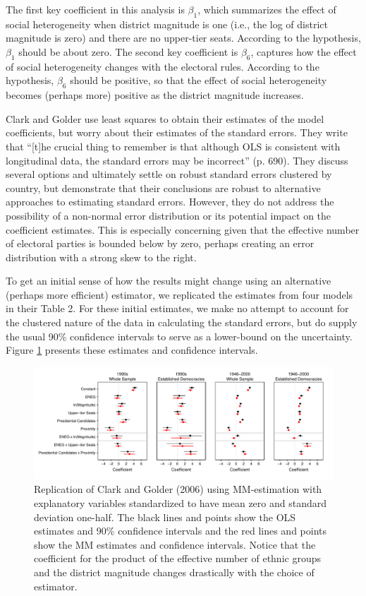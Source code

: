 \documentclass[10pt]{article}
\begin{document}
The first key coefficient in this analysis is $\beta_1$, which summarizes the effect of social heterogeneity when district magnitude is one (i.e., the log of district magnitude is zero) and there are no upper-tier seats. According to the hypothesis, $\beta_1$ should be about zero. The second key coefficient is $\beta_6$, captures how the effect of social heterogeneity changes with the electoral rules. According to the hypothesis, $\beta_6$ should be positive, so that the effect of social heterogeneity becomes (perhaps more) positive as the district magnitude increases.

Clark and Golder use least squares to obtain their estimates of the model coefficients, but worry about their estimates of the standard errors. They write that ``[t]he crucial thing to remember is that although OLS is consistent with longitudinal data, the standard errors may be incorrect'' (p. 690). They discuss several options and ultimately settle on robust standard errors clustered by country, but demonstrate that their conclusions are robust to alternative approaches to estimating standard errors. However, they do not address the possibility of a non-normal error distribution or its potential impact on the coefficient estimates. This is especially concerning given that the effective number of electoral parties is bounded below by zero, perhaps creating an error distribution with a strong skew to the right. 

To get an initial sense of how the results might change using an alternative (perhaps more efficient) estimator, we replicated the estimates from four models in their Table 2. For these initial estimates, we make no attempt to account for the clustered nature of the data in calculating the standard errors, but do supply the usual 90\% confidence intervals to serve as a lower-bound on the uncertainty. Figure \ref{fig:cg-coef-plots} presents these estimates and confidence intervals.

\begin{figure}[H]
\begin{center}
\includegraphics[scale = .8]{figs/cg-coef-plots.pdf}
\caption{Replication of Clark and Golder (2006) using MM-estimation with explanatory variables standardized to have mean zero and standard deviation one-half. The black lines and points show the OLS estimates and 90\% confidence intervals and the red lines and points show the MM estimates and confidence intervals. Notice that the coefficient for the product of the effective number of ethnic groups and the district magnitude changes drastically with the choice of estimator.}\label{fig:cg-coef-plots}
\end{center}
\end{figure}
\end{document}
